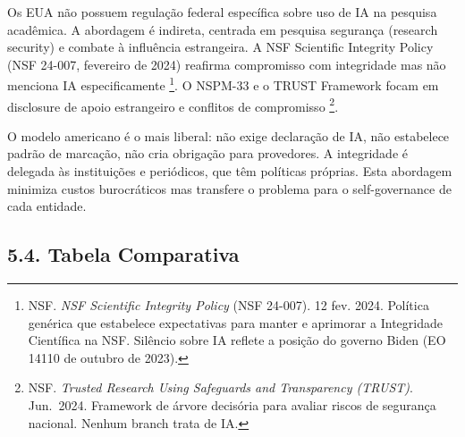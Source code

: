 \documentclass[
  12pt,
  a4paper,
  brazil,
  twoside
]{report}
\begin{document}
Os EUA não possuem regulação federal específica sobre uso de IA na
pesquisa acadêmica. A abordagem é indireta, centrada em pesquisa
segurança (research security) e combate à influência estrangeira. A NSF
Scientific Integrity Policy (NSF 24-007, fevereiro de 2024) reafirma
compromisso com integridade mas não menciona IA especificamente
\footnote{NSF. \emph{NSF Scientific Integrity Policy} (NSF 24-007). 12
  fev. 2024. Política genérica que estabelece expectativas para manter e
  aprimorar a Integridade Científica na NSF. Silêncio sobre IA reflete a
  posição do governo Biden (EO 14110 de outubro de 2023).}. O NSPM-33 e
o TRUST Framework focam em disclosure de apoio estrangeiro e conflitos
de compromisso \footnote{NSF. \emph{Trusted Research Using Safeguards
  and Transparency (TRUST)}. Jun.~2024. Framework de árvore decisória
  para avaliar riscos de segurança nacional. Nenhum branch trata de IA.}.

O modelo americano é o mais liberal: não exige declaração de IA, não
estabelece padrão de marcação, não cria obrigação para provedores. A
integridade é delegada às instituições e periódicos, que têm políticas
próprias. Esta abordagem minimiza custos burocráticos mas transfere o
problema para o self-governance de cada entidade.

\subsection{5.4. Tabela Comparativa}\label{tabela-comparativa}
\end{document}
